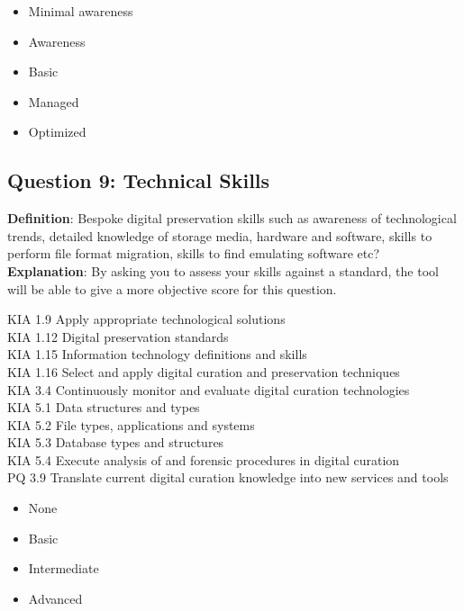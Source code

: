 \documentclass[a4paper,oneside]{article}
\providecommand{\tightlist}{%
    \setlength{\itemsep}{2pt}\setlength{\parskip}{0pt}}
\begin{document}
\begin{landscape}
\begin{itemize}
\tightlist
\item
  Minimal awareness\\
\item
  Awareness\\
\item
  Basic\\
\item
  Managed\\
\item
  Optimized
\end{itemize}

\newpage

\hypertarget{question-9-technical-skills}{%
\subsection{Question 9: Technical Skills}\label{question-9-technical-skills}}

\textbf{Definition}: Bespoke digital preservation skills such as awareness of technological trends, detailed knowledge of storage media, hardware and software, skills to perform file format migration, skills to find emulating software etc?\\
\textbf{Explanation}: By asking you to assess your skills against a standard, the tool will be able to give a more objective score for this question.

KIA 1.9 Apply appropriate technological solutions\\
KIA 1.12 Digital preservation standards\\
KIA 1.15 Information technology definitions and skills\\
KIA 1.16 Select and apply digital curation and preservation techniques\\
KIA 3.4 Continuously monitor and evaluate digital curation technologies\\
KIA 5.1 Data structures and types\\
KIA 5.2 File types, applications and systems\\
KIA 5.3 Database types and structures\\
KIA 5.4 Execute analysis of and forensic procedures in digital curation\\
PQ 3.9 Translate current digital curation knowledge into new services and tools

\begin{itemize}
\tightlist
\item
  None\\
\item
  Basic\\
\item
  Intermediate\\
\item
  Advanced
\end{itemize}

\newpage

\end{landscape}
\end{document}
